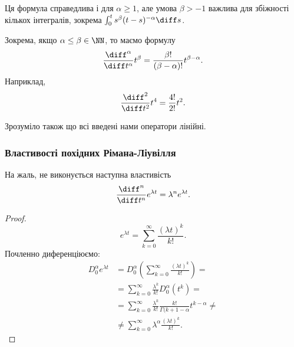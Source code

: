 \begin{remark}
    Ця формула справедлива і для $\alpha \ge 1$, але умова $\beta > -1$ важлива для збіжності кількох інтегралів, зокрема $\int_0^t s^\beta (t- s)^{-\alpha} \diff s$.
\end{remark}

\begin{example}
    Зокрема, якщо $\alpha \le \beta \in \NN$, то маємо формулу
    \begin{equation}
        \frac{\diff^\alpha}{\diff t^\alpha} t^\beta = \frac{\beta!}{(\beta - \alpha)!} t^{\beta - \alpha}.
    \end{equation}
    Наприклад,
    \begin{equation}
        \frac{\diff^2}{\diff t^2} t^4 = \frac{4!}{2!} t^2.
    \end{equation}
\end{example}

\begin{remark}
    Зрозуміло також що всі введені нами оператори лінійні.
\end{remark}

\subsubsection{Властивості похідних Рімана-Ліувілля}

\begin{proposition}
    На жаль, не виконується наступна властивість
    \begin{equation}
        \frac{\diff^n}{\diff t^n} e^{\lambda t} = \lambda^n e^{\lambda t}.
    \end{equation}
\end{proposition}

\begin{proof}
    \begin{equation}
        e^{\lambda t} = \sum_{k = 0}^\infty \frac{(\lambda t)^k}{k!}.
    \end{equation}
    Почленно диференціюємо:
    \begin{equation}
        \begin{aligned} 
            D_0^\alpha e^{\lambda t} 
            &= D_0^\alpha \left( \sum_{k = 0}^\infty \frac{(\lambda t)^k}{k!} \right) = \\
            &= \sum_{k = 0}^\infty \frac{\lambda^k}{k!} D_0^\alpha \left( t^k \right) = \\
            &= \sum_{k = 0}^\infty \frac{\lambda^k}{k!} \frac{k!}{\Gamma(k + 1 - \alpha} t^{k - \alpha} \ne \\
            &\ne \sum_{k = 0}^\infty \lambda^\alpha \frac{(\lambda t)^k}{k!}.
        \end{aligned}
    \end{equation}
\end{proof}

